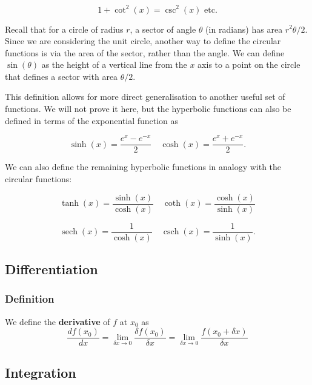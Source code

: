 \documentclass[11pt,titlepage]{article}
\numberwithin{equation}{subsection}
\begin{document}
\begin{equation}
1+\cot^{2}(x)=\csc^{2}(x) \text{ etc.}
\end{equation}

Recall that for a circle of radius $r$, a sector of angle $\theta$ (in radians) has area $r^{2}\theta/2$. Since we are considering the unit circle, another way to define the circular functions is via the area of the sector, rather than the angle. We can define $\sin(\theta)$ as the height of a vertical line from the $x$ axis to a point on the circle that defines a sector with area $\theta/2$.

This definition allows for more direct generalisation to another useful set of functions.
We will not prove it here, but the hyperbolic functions can also be defined in terms of the exponential function as

\begin{equation}
\sinh(x) = \frac{e^{x} - e^{-x}}{2} \quad \cosh(x) = \frac{e^{x} + e^{-x}}{2}.
\end{equation}

We can also define the remaining hyperbolic functions in analogy with the circular functions:

\begin{equation}
\tanh(x) = \frac{\sinh(x)}{\cosh(x)} \quad \coth(x) = \frac{\cosh(x)}{\sinh(x)}
\end{equation}

\begin{equation}
\operatorname{sech}(x) = \frac{1}{\cosh(x)} \quad \operatorname{csch}(x) = \frac{1}{\sinh(x)}.
\end{equation}

\subsection{Differentiation}
\subsubsection{Definition}
We define the \textbf{derivative} of $f$ at $x_0$ as 
\begin{equation}
    \frac{df(x_0)}{dx}=\lim_{\delta x\rightarrow 0}\frac{\delta f(x_0)}{\delta x}=\lim_{\delta x\rightarrow 0}\frac{f(x_0+\delta x)}{\delta x}
\end{equation}
\subsection{Integration}
\end{document}
